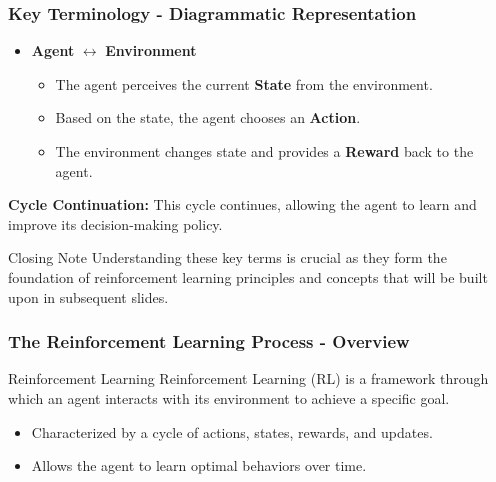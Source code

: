 \documentclass[aspectratio=169]{beamer}
\begin{document}
\begin{frame}[fragile]
    \frametitle{Key Terminology - Diagrammatic Representation}
    \begin{itemize}
        \item \textbf{Agent} $\leftrightarrow$ \textbf{Environment}
            \begin{itemize}
                \item The agent perceives the current \textbf{State} from the environment.
                \item Based on the state, the agent chooses an \textbf{Action}.
                \item The environment changes state and provides a \textbf{Reward} back to the agent.
            \end{itemize}
    \end{itemize}

    \textbf{Cycle Continuation:} This cycle continues, allowing the agent to learn and improve its decision-making policy.
    
    \begin{block}{Closing Note}
        Understanding these key terms is crucial as they form the foundation of reinforcement learning principles and concepts that will be built upon in subsequent slides.
    \end{block}
\end{frame}

\begin{frame}[fragile]
    \frametitle{The Reinforcement Learning Process - Overview}
    \begin{block}{Reinforcement Learning}
        Reinforcement Learning (RL) is a framework through which an agent interacts with its environment to achieve a specific goal.
    \end{block}
    
    \begin{itemize}
        \item Characterized by a cycle of actions, states, rewards, and updates.
        \item Allows the agent to learn optimal behaviors over time.
    \end{itemize}
\end{frame}
\end{document}
